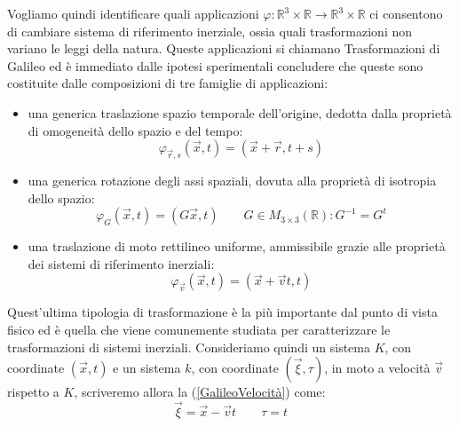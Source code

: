 Vogliamo quindi identificare quali applicazioni $\varphi:\mathbb{R}^3\times\mathbb{R}\rightarrow
\mathbb{R}^3\times\mathbb{R}$ ci consentono di cambiare sistema di riferimento inerziale, ossia quali 
trasformazioni non variano le leggi della natura. Queste applicazioni si chiamano Trasformazioni di 
Galileo ed è immediato dalle ipotesi sperimentali concludere che queste sono costituite dalle 
composizioni di tre famiglie di applicazioni:
\begin{itemize}
	\item una generica traslazione spazio temporale dell'origine, dedotta dalla proprietà 
	di omogeneità dello spazio e del tempo:
	\begin{equation}
		\varphi_{\vec{r},s}(\vec{x},t)=(\vec{x}+\vec{r},t+s)
		\label{GalileoTraslazoine}
	\end{equation} 
\item una generica rotazione degli assi spaziali, dovuta alla proprietà di isotropia dello spazio:
\begin{equation}
	\varphi_{G}(\vec{x},t)=(G\vec{x},t) \qquad G\in M_{3\times3}(\mathbb{R}):G^{-1}=G^t
	\label{GalileoRotazione}
\end{equation} 
	\item una traslazione di moto rettilineo uniforme, ammissibile grazie alle proprietà dei sistemi 
	di riferimento inerziali:
\begin{equation}
	\varphi_{\vec{v}}(\vec{x},t)=(\vec{x}+\vec{v}t,t)
	\label{GalileoVelocità}
\end{equation} 
\end{itemize}
Quest'ultima tipologia di trasformazione è la più importante dal punto di vista fisico ed è quella 
che viene comunemente studiata per caratterizzare le trasformazioni di sistemi inerziali. 
Consideriamo quindi un sistema $K$, con coordinate $(\vec{x},t)$ e un sistema $k$, con 
coordinate $(\vec{\xi},\tau)$, in moto a velocità $\vec{v}$ rispetto a $K$, scriveremo allora la 
(\ref{GalileoVelocità}) come:
\begin{equation}
	\vec\xi=\vec{x}-\vec{v}t \qquad \tau=t
	\label{GalileoEasy}
\end{equation}

